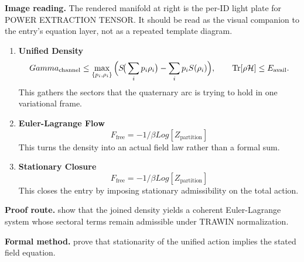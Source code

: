 \begin{samepage}
\noindent\begin{minipage}[t]{0.45\linewidth}
\vspace{0pt}
\raggedright
\scriptsize\textbf{Image reading.} The rendered manifold at right is the per-ID light plate for POWER EXTRACTION TENSOR. It should be read as the visual companion to the entry's equation layer, not as a repeated template diagram.\par
\end{minipage}\hfill
\begin{minipage}[t]{0.53\linewidth}
\vspace*{-0.10in}
\raggedright
{}
\end{minipage}
\end{samepage}

\clearpage


\begin{enumerate}[leftmargin=1.6em,itemsep=9pt,topsep=6pt]
\item \textbf{Unified Density}
\[
Gamma_{\rm channel} \le \max_{\{p_i,\rho_i\}}\Big( S\!\big(\sum_i p_i\rho_i\big)-\sum_i p_i S(\rho_i)\Big), \qquad \mathrm{Tr}[\rho \mathcal H]\le E_{\rm avail}.
\]
This gathers the sectors that the quaternary arc is trying to hold in one variational frame.

\item \textbf{Euler-Lagrange Flow}
\[
F_{\mathrm{free}} = -1/\beta Log[Z_{\mathrm{partition}}]
\]
This turns the density into an actual field law rather than a formal sum.

\item \textbf{Stationary Closure}
\[
F_{\mathrm{free}} = -1/\beta Log[Z_{\mathrm{partition}}]
\]
This closes the entry by imposing stationary admissibility on the total action.
\end{enumerate}

\textbf{Proof route.} show that the joined density yields a coherent Euler-Lagrange system whose sectoral terms remain admissible under TRAWIN normalization.

\textbf{Formal method.} prove that stationarity of the unified action implies the stated field equation.

\medskip
{}

